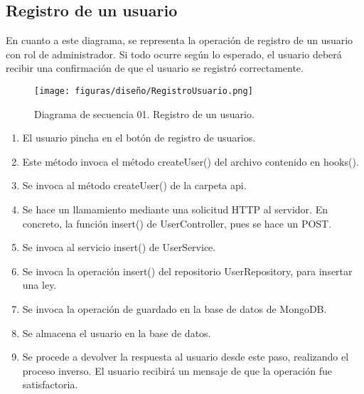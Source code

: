 \subsection{Registro de un usuario}

En cuanto a este diagrama, se representa la operación de registro de un usuario con rol de administrador. Si todo ocurre según lo esperado, el usuario deberá recibir una confirmación de que el usuario se registró correctamente.

\begin{figure}[H]
\centerline{\texttt{[image: figuras/diseño/RegistroUsuario.png]}}
\caption{Diagrama de secuencia 01. Registro de un usuario.}
\label{enlaceDRegistro}
\end{figure}

\begin{enumerate}
    \item El usuario pincha en el botón de registro de usuarios.
    \item Este método invoca el método createUser() del archivo contenido en hooks().
    \item Se invoca al método createUser() de la carpeta api.
    \item Se hace un llamamiento mediante una solicitud HTTP al servidor. En concreto, la función insert() de UserController, pues se hace un POST.
    \item Se invoca al servicio insert() de UserService.
    \item Se invoca la operación insert() del repositorio UserRepository, para insertar una ley.
    \item Se invoca la operación de guardado en la base de datos de MongoDB.
    \item Se almacena el usuario en la base de datos.
    \item Se procede a devolver la respuesta al usuario desde este paso, realizando el proceso inverso. El usuario recibirá un mensaje de que la operación fue satisfactoria.
\end{enumerate}
